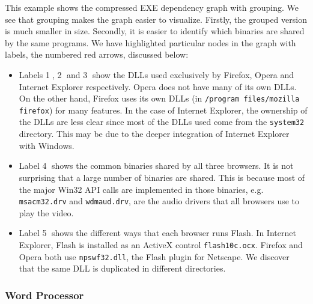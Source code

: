 This example shows the compressed EXE dependency gra\-ph
with grouping.
We see that grouping makes the graph easier to visualize.
Firstly, the grouped version is much smaller in size.
Secondly, it is easier to identify which binaries are shared by the same programs.
We have highlighted particular nodes in the graph with
labels, the numbered red arrows, discussed below:
\begin{itemize}


\item Labels \textcircled{1}, \textcircled{2} and \textcircled{3}
show the DLLs used exclusively by Firefox, Opera
and Internet Explorer respectively. Opera does not have many  of its own DLLs.
On the other hand, Firefox uses its own DLLs (in {\tt /program files/mozilla firefox}) for many features.
In the case of Internet Explorer, the ownership of the DLLs are less clear
since most of the DLLs used come from the {\tt system32} directory.
This may be due to the deeper integration of Internet Explorer with
Windows.

\item Label \textcircled{4} shows the common binaries shared by all three browsers.
It is not surprising that a large number of binaries are shared.
This is because most of the major Win32 API calls
are implemented in those binaries, e.g.
\texttt{msacm32.drv} and \texttt{wdmaud.drv},
are the audio drivers that all browsers use to play the video.

\item Label \textcircled{5} shows the different ways that each browser runs Flash.
In Internet Explorer,
Flash is installed as an ActiveX control \texttt{flash10c.ocx}.
Firefox and Opera both use \texttt{npswf32.dll}, the Flash plugin
for Netscape. We discover that the same DLL is duplicated in
different directories.

\end{itemize}

\subsubsection{Word Processor}

